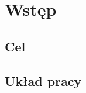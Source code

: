 \chapter{Wstęp}\label{Chapter_Wstep}

\section{Cel}\label{Section_Aim}

\section{Układ pracy}\label{Section_Layout}